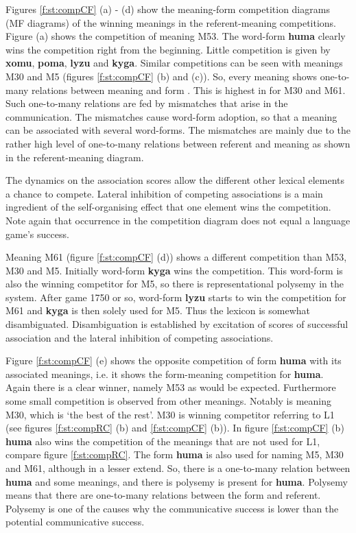 Figures \ref{f:st:compCF} (a) - (d) show the meaning-form competition diagrams (MF diagrams) of the winning meanings in the referent-meaning competitions. Figure (a) shows the competition of meaning M53. The word-form {\bf huma} clearly wins the competition right from the beginning. Little competition is given by {\bf xomu}, {\bf poma}, {\bf lyzu} and {\bf kyga}. Similar competitions can be seen with meanings M30 and M5 (figures \ref{f:st:compCF} (b) and (c)). So, every meaning shows one-to-many relations between meaning and form . This is highest in for M30 and M61. Such one-to-many relations are fed by mismatches that arise in the communication. The mismatches cause word-form adoption, so that a meaning can be associated with several word-forms. The mismatches are mainly due to the rather high level of one-to-many relations between referent and meaning as shown in the referent-meaning diagram. 

The dynamics on the association scores allow the different other lexical elements a chance to compete. Lateral inhibition of competing associations is a main ingredient of the self-organising effect that one element wins the competition. Note again that occurrence in the competition diagram does not equal a language game's success.



Meaning M61 (figure \ref{f:st:compCF} (d)) shows a different competition than M53, M30 and M5. Initially word-form {\bf kyga} wins the competition. This word-form is also the winning competitor for M5, so there is representational polysemy in the system. After game 1750 or so, word-form {\bf lyzu} starts to win the competition for M61 and {\bf kyga} is then solely used for M5. Thus the lexicon is somewhat disambiguated. Disambiguation is established by excitation of scores of successful association and the lateral inhibition of competing associations.


Figure \ref{f:st:compCF} (e) shows the opposite competition of form {\bf huma} with its associated meanings, i.e. it shows the form-meaning competition for {\bf huma}. Again there is a clear winner, namely M53 as would be expected. Furthermore some small competition is observed from other meanings. Notably is meaning M30, which is `the best of the rest'. M30 is winning competitor referring to L1 (see figures \ref{f:st:compRC} (b) and \ref{f:st:compCF} (b)). In figure \ref{f:st:compCF} (b) {\bf huma} also wins the competition of the meanings that are not used for L1, compare figure \ref{f:st:compRC}.  The form {\bf huma} is also used for naming M5, M30 and M61, although in a lesser extend. So, there is a one-to-many relation between {\bf huma} and some meanings, and there is polysemy is present for {\bf huma}. Polysemy means that there are one-to-many relations between the form and referent. Polysemy is one of the causes why the communicative success is lower than the potential communicative success.


